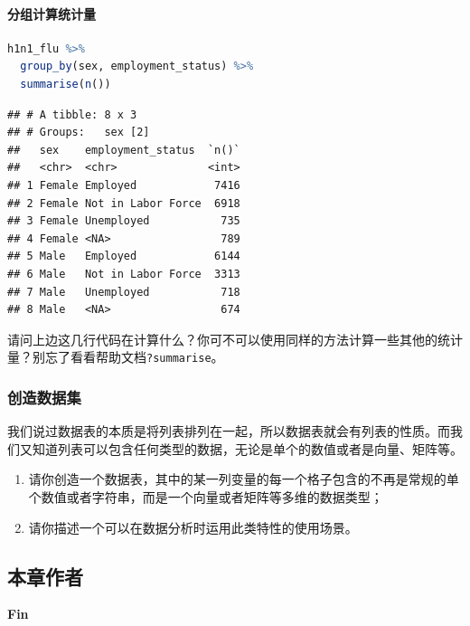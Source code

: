 \documentclass[]{ctexbook}
\providecommand{\tightlist}{%
  \setlength{\itemsep}{0pt}\setlength{\parskip}{0pt}}
\let\oldparagraph\paragraph
\renewcommand{\paragraph}[1]{\oldparagraph{#1}\mbox{}}
\newcommand{\passthrough}[1]{#1}
\begin{document}
\hypertarget{ux5206ux7ec4ux8ba1ux7b97ux7edfux8ba1ux91cf}{%
\paragraph{分组计算统计量}\label{ux5206ux7ec4ux8ba1ux7b97ux7edfux8ba1ux91cf}}

\begin{lstlisting}[language=R]
h1n1_flu %>% 
  group_by(sex, employment_status) %>% 
  summarise(n())
\end{lstlisting}

\begin{lstlisting}
## # A tibble: 8 x 3
## # Groups:   sex [2]
##   sex    employment_status  `n()`
##   <chr>  <chr>              <int>
## 1 Female Employed            7416
## 2 Female Not in Labor Force  6918
## 3 Female Unemployed           735
## 4 Female <NA>                 789
## 5 Male   Employed            6144
## 6 Male   Not in Labor Force  3313
## 7 Male   Unemployed           718
## 8 Male   <NA>                 674
\end{lstlisting}

请问上边这几行代码在计算什么？你可不可以使用同样的方法计算一些其他的统计量？别忘了看看帮助文档\passthrough{\lstinline!?summarise!}。

\hypertarget{ux521bux9020ux6570ux636eux96c6}{%
\subsubsection{创造数据集}\label{ux521bux9020ux6570ux636eux96c6}}

我们说过数据表的本质是将列表排列在一起，所以数据表就会有列表的性质。而我们又知道列表可以包含任何类型的数据，无论是单个的数值或者是向量、矩阵等。

\begin{enumerate}
\def\labelenumi{\arabic{enumi}.}
\tightlist
\item
  请你创造一个数据表，其中的某一列变量的每一个格子包含的不再是常规的单个数值或者字符串，而是一个向量或者矩阵等多维的数据类型；
\item
  请你描述一个可以在数据分析时运用此类特性的使用场景。
\end{enumerate}

\hypertarget{ux672cux7ae0ux4f5cux8005-1}{%
\subsection*{本章作者}\label{ux672cux7ae0ux4f5cux8005-1}}


\textbf{Fin}
\end{document}
